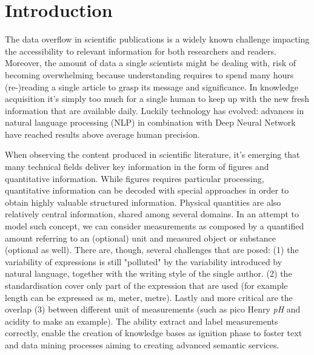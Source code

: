 \documentclass[sigconf]{acmart}
\begin{document}


\maketitle

\section{Introduction}

The data overflow in scientific publications is a widely known challenge impacting the accessibility to relevant information for both researchers and readers. Moreover, the amount of data a single scientists might be dealing with, risk of becoming overwhelming because understanding requires to spend many hours (re-)reading a single article to grasp its message and significance. In knowledge acquisition it's simply too much for a single human to keep up with the new fresh information that are available daily. 
Luckily technology has evolved: advances in natural language processing (NLP) in combination with Deep Neural Network have reached results above average human precision. 

When observing the content produced in scientific literature, it's emerging that many technical fields deliver key information in the form of figures and quantitative information. While figures requires particular processing, quantitative information can be decoded with special approaches in order to obtain highly valuable structured information. Physical quantities are also relatively central information, shared among several domains. In an attempt to model such concept, we can consider measurements as composed by a quantified amount referring to an (optional) unit and measured object or substance (optional as well). 
There are, though, several challenges that are posed: (1) the variability of expressions is still "polluted" by the variability introduced by natural language, together with the writing style of the single author. (2) the standardisation cover only part of the expression that are used (for example length can be expressed as m, meter, metre). Lastly and more critical are the overlap (3) between different unit of measurements (such as pico Henry \textit{pH} and acidity to make an example). The ability extract and label measurements correctly, enable the creation of knowledge bases as ignition phase to foster text and data mining processes aiming to creating advanced semantic services. 
\end{document}
